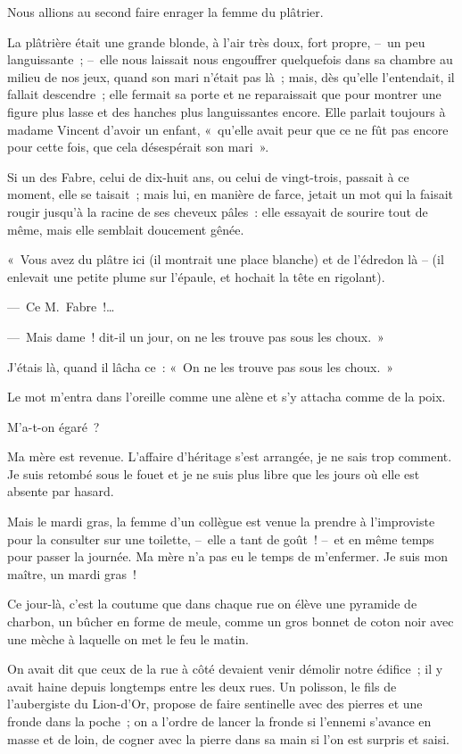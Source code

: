 \documentclass[french,twoside]{book} %
\begin{document}
\bigbreak
\noindent Nous allions au second faire enrager la femme du plâtrier.\par
La plâtrière était une grande blonde, à l’air très doux, fort propre, – un peu languissante ; – elle nous laissait nous engouffrer quelquefois dans sa chambre au milieu de nos jeux, quand son mari n’était pas là ; mais, dès qu’elle l’entendait, il fallait descendre ; elle fermait sa porte et ne reparaissait que pour montrer une figure plus lasse et des hanches plus languissantes encore. Elle parlait toujours à madame Vincent d’avoir un enfant, « qu’elle avait peur que ce ne fût pas encore pour cette fois, que cela désespérait son mari ».\par
Si un des Fabre, celui de dix-huit ans, ou celui de vingt-trois, passait à ce moment, elle se taisait ; mais lui, en manière de farce, jetait un mot qui la faisait rougir jusqu’à la racine de ses cheveux pâles : elle essayait de sourire tout de même, mais elle semblait doucement gênée.\par
« Vous avez du plâtre ici (il montrait une place blanche) et de l’édredon là – (il enlevait une petite plume sur l’épaule, et hochait la tête en rigolant).\par
— Ce M. Fabre !…\par
— Mais dame ! dit-il un jour, on ne les trouve pas sous les choux. »\par
J’étais là, quand il lâcha ce : « On ne les trouve pas sous les choux. »\par
\bigbreak
\noindent Le mot m’entra dans l’oreille comme une alène et s’y attacha comme de la poix.\par
M’a-t-on égaré ?\par
\bigbreak
\noindent Ma mère est revenue. L’affaire d’héritage s’est arrangée, je ne sais trop comment. Je suis retombé sous le fouet et je ne suis plus libre que les jours où elle est absente par hasard.\par
Mais le mardi gras, la femme d’un collègue est venue la prendre à l’improviste pour la consulter sur une toilette, – elle a tant de goût ! – et en même temps pour passer la journée. Ma mère n’a pas eu le temps de m’enfermer. Je suis mon maître, un mardi gras !\par
Ce jour-là, c’est la coutume que dans chaque rue on élève une pyramide de charbon, un bûcher en forme de meule, comme un gros bonnet de coton noir avec une mèche à laquelle on met le feu le matin.\par
On avait dit que ceux de la rue à côté devaient venir démolir notre édifice ; il y avait haine depuis longtemps entre les deux rues. Un polisson, le fils de l’aubergiste du Lion-d’Or, propose de faire sentinelle avec des pierres et une fronde dans la poche ; on a l’ordre de lancer la fronde si l’ennemi s’avance en masse et de loin, de cogner avec la pierre dans sa main si l’on est surpris et saisi.\par
\end{document}
